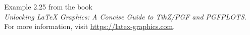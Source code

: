 \documentclass{article}
\begin{document}
Example 2.25 from the book\\
\emph{Unlocking LaTeX Graphics: A Concise Guide to Ti$k$Z/PGF and PGFPLOTS}.\\
For more information, visit \url{https://latex-graphics.com}.
\par\bigskip

\end{document}
